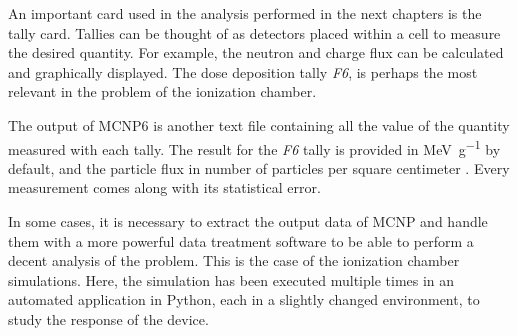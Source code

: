 An important card used in the analysis performed in the next chapters is the tally card. Tallies can be thought of as detectors placed within a cell to measure the desired quantity. For example, the neutron and charge flux can be calculated and graphically displayed. The dose deposition tally \textit{F6}, is perhaps the most relevant in the problem of the ionization chamber. 

The output of MCNP6 is another text file containing all the value of the quantity measured with each tally. The result for the \textit{F6} tally is provided in \unit{\mega\electronvolt\per\gram} by default, and the particle flux in number of particles per square centimeter \cite{mcnp6Manual}. Every measurement comes along with its statistical error.

In some cases, it is necessary to extract the output data of MCNP and handle them with a more powerful data treatment software to be able to perform a decent analysis of the problem. This is the case of the ionization chamber simulations. Here, the simulation has been executed multiple times in an automated application in Python, each in a slightly changed environment, to study the response of the device. 
